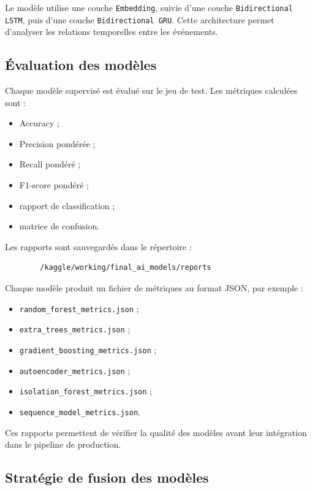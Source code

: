 \documentclass[12pt,a4paper,oneside]{report}
\begin{document}
	Le modèle utilise une couche \texttt{Embedding}, suivie d'une couche \texttt{Bidirectional LSTM}, puis d'une couche \texttt{Bidirectional GRU}. Cette architecture permet d'analyser les relations temporelles entre les événements.
	
	\subsection{Évaluation des modèles}
	
	Chaque modèle supervisé est évalué sur le jeu de test. Les métriques calculées sont :
	
	\begin{itemize}
		\item Accuracy ;
		\item Precision pondérée ;
		\item Recall pondéré ;
		\item F1-score pondéré ;
		\item rapport de classification ;
		\item matrice de confusion.
	\end{itemize}
	
	Les rapports sont sauvegardés dans le répertoire :
	
	\begin{lstlisting}
		/kaggle/working/final_ai_models/reports
	\end{lstlisting}
	
	Chaque modèle produit un fichier de métriques au format JSON, par exemple :
	
	\begin{itemize}
		\item \texttt{random\_forest\_metrics.json} ;
		\item \texttt{extra\_trees\_metrics.json} ;
		\item \texttt{gradient\_boosting\_metrics.json} ;
		\item \texttt{autoencoder\_metrics.json} ;
		\item \texttt{isolation\_forest\_metrics.json} ;
		\item \texttt{sequence\_model\_metrics.json}.
	\end{itemize}
	
	Ces rapports permettent de vérifier la qualité des modèles avant leur intégration dans le pipeline de production.
	
	\subsection{Stratégie de fusion des modèles}
	
\end{document}
